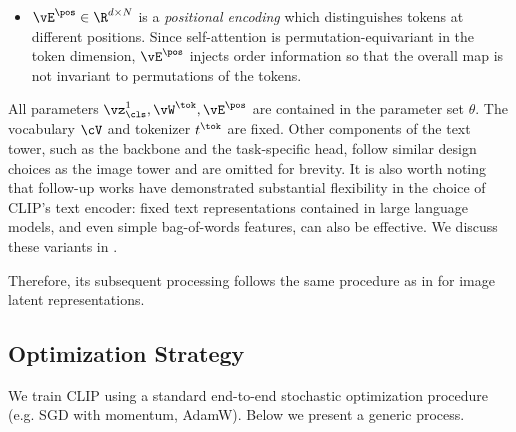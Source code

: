 \documentclass[../../book-main.tex]{subfiles}
\begin{document}
\begin{enumerate}
\begin{itemize}
                \textit{classification} (or \textit{summary}) token.
                Heuristically, it is meant to aggregate global
                information about the entire sequence and is commonly
                used for downstream prediction tasks.
            \item \(\vE^{\pos} \in \R^{d \times N}\) is a
                \textit{positional encoding} which distinguishes
                tokens at different positions.
                Since self-attention
                is permutation-equivariant in the token dimension,
                \(\vE^{\pos}\) injects order information so that the
                overall map is not invariant to permutations of the
                tokens.
        \end{itemize}
\end{enumerate}
All parameters \(\vz_{\cls}^{1}, \vW^{\tok}, \vE^{\pos}\) are
contained in the parameter set \(\theta\). The vocabulary \(\cV\) and tokenizer \(t^{\tok}\) are fixed.
Other components of the text tower, such as the backbone and the task-specific head, follow similar design choices as the image tower and are omitted for brevity.
It is also worth noting that follow-up works have demonstrated substantial flexibility in the choice of CLIP's text encoder: fixed text representations contained in large language models, and even simple bag-of-words features, can also be effective.
We discuss these variants in .

Therefore, its subsequent processing follows the same procedure as in  for image latent representations.

\subsection{Optimization Strategy}
We train CLIP using a standard end-to-end stochastic optimization
procedure (e.g. SGD with momentum, AdamW).
Below we present a generic process.
\end{document}

